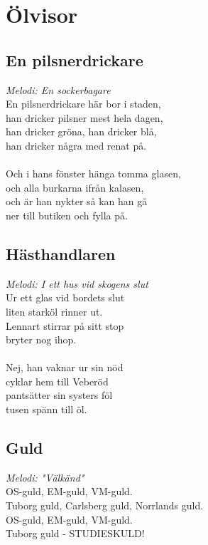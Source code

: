 \chapter{Ölvisor}
\section{En pilsnerdrickare}
\textit{Melodi: En sockerbagare}
\vspace{2mm}\\
En pilsnerdrickare här bor i staden,\\
han dricker pilsner mest hela dagen,\\
han dricker gröna, han dricker blå,\\
han dricker några med renat på.\\
\\
Och i hans fönster hänga tomma glasen,\\
och alla burkarna ifrån kalasen,\\
och är han nykter så kan han gå\\
ner till butiken och fylla på.

\section{Hästhandlaren}
\textit{Melodi: I ett hus vid skogens slut}
\vspace{2mm}\\
Ur ett glas vid bordets slut\\
liten starköl rinner ut.\\
Lennart stirrar på sitt stop\\
bryter nog ihop.\\
\\
Nej, han vaknar ur sin nöd\\
cyklar hem till Veberöd\\
pantsätter sin systers föl\\
tusen spänn till öl.

\section{Guld}
\textit{Melodi: "Välkänd"}
\vspace{2mm}\\
OS-guld, EM-guld, VM-guld.\\
Tuborg guld, Carlsberg guld, Norrlands guld.\\
OS-guld, EM-guld, VM-guld.\\
Tuborg guld - STUDIESKULD!

